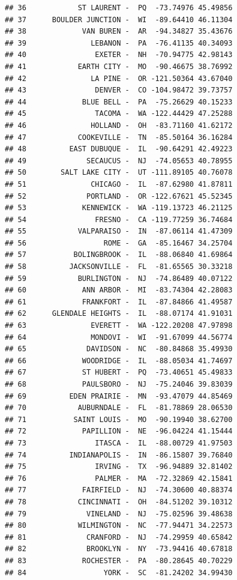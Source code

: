 \documentclass{article}\usepackage[]{graphicx}\usepackage[]{color}
\makeatletter
\newenvironment{kframe}{%
 \def\at@end@of@kframe{}%
 \ifinner\ifhmode%
  \def\at@end@of@kframe{\end{minipage}}%
  \begin{minipage}{\columnwidth}%
 \fi\fi%
 \def\FrameCommand##1{\hskip\@totalleftmargin \hskip-\fboxsep
 \colorbox{shadecolor}{##1}\hskip-\fboxsep
     \hskip-\linewidth \hskip-\@totalleftmargin \hskip\columnwidth}%
 \MakeFramed {\advance\hsize-\width
   \@totalleftmargin\z@ \linewidth\hsize
   \@setminipage}}%
 {\par\unskip\endMakeFramed%
 \at@end@of@kframe}
\newenvironment{knitrout}{}{} %
\makeatother
\begin{document}
\begin{knitrout}
\begin{kframe}
\begin{verbatim}
## 36            ST LAURENT -  PQ  -73.74976 45.49856
## 37      BOULDER JUNCTION -  WI  -89.64410 46.11304
## 38             VAN BUREN -  AR  -94.34827 35.43676
## 39               LEBANON -  PA  -76.41135 40.34093
## 40                EXETER -  NH  -70.94775 42.98143
## 41            EARTH CITY -  MO  -90.46675 38.76992
## 42               LA PINE -  OR -121.50364 43.67040
## 43                DENVER -  CO -104.98472 39.73757
## 44             BLUE BELL -  PA  -75.26629 40.15233
## 45                TACOMA -  WA -122.44429 47.25288
## 46               HOLLAND -  OH  -83.71160 41.62172
## 47            COOKEVILLE -  TN  -85.50164 36.16284
## 48          EAST DUBUQUE -  IL  -90.64291 42.49223
## 49              SECAUCUS -  NJ  -74.05653 40.78955
## 50        SALT LAKE CITY -  UT -111.89105 40.76078
## 51               CHICAGO -  IL  -87.62980 41.87811
## 52              PORTLAND -  OR -122.67621 45.52345
## 53             KENNEWICK -  WA -119.13723 46.21125
## 54                FRESNO -  CA -119.77259 36.74684
## 55            VALPARAISO -  IN  -87.06114 41.47309
## 56                  ROME -  GA  -85.16467 34.25704
## 57           BOLINGBROOK -  IL  -88.06840 41.69864
## 58          JACKSONVILLE -  FL  -81.65565 30.33218
## 59            BURLINGTON -  NJ  -74.86489 40.07122
## 60             ANN ARBOR -  MI  -83.74304 42.28083
## 61             FRANKFORT -  IL  -87.84866 41.49587
## 62      GLENDALE HEIGHTS -  IL  -88.07174 41.91031
## 63               EVERETT -  WA -122.20208 47.97898
## 64               MONDOVI -  WI  -91.67099 44.56774
## 65              DAVIDSON -  NC  -80.84868 35.49930
## 66             WOODRIDGE -  IL  -88.05034 41.74697
## 67             ST HUBERT -  PQ  -73.40651 45.49833
## 68             PAULSBORO -  NJ  -75.24046 39.83039
## 69          EDEN PRAIRIE -  MN  -93.47079 44.85469
## 70            AUBURNDALE -  FL  -81.78869 28.06530
## 71           SAINT LOUIS -  MO  -90.19940 38.62700
## 72             PAPILLION -  NE  -96.04224 41.15444
## 73                ITASCA -  IL  -88.00729 41.97503
## 74          INDIANAPOLIS -  IN  -86.15807 39.76840
## 75                IRVING -  TX  -96.94889 32.81402
## 76                PALMER -  MA  -72.32869 42.15841
## 77             FAIRFIELD -  NJ  -74.30600 40.88374
## 78            CINCINNATI -  OH  -84.51202 39.10312
## 79              VINELAND -  NJ  -75.02596 39.48638
## 80            WILMINGTON -  NC  -77.94471 34.22573
## 81              CRANFORD -  NJ  -74.29959 40.65842
## 82              BROOKLYN -  NY  -73.94416 40.67818
## 83             ROCHESTER -  PA  -80.28645 40.70229
## 84                  YORK -  SC  -81.24202 34.99430

\end{verbatim}
\end{kframe}
\end{knitrout}
\end{document}
